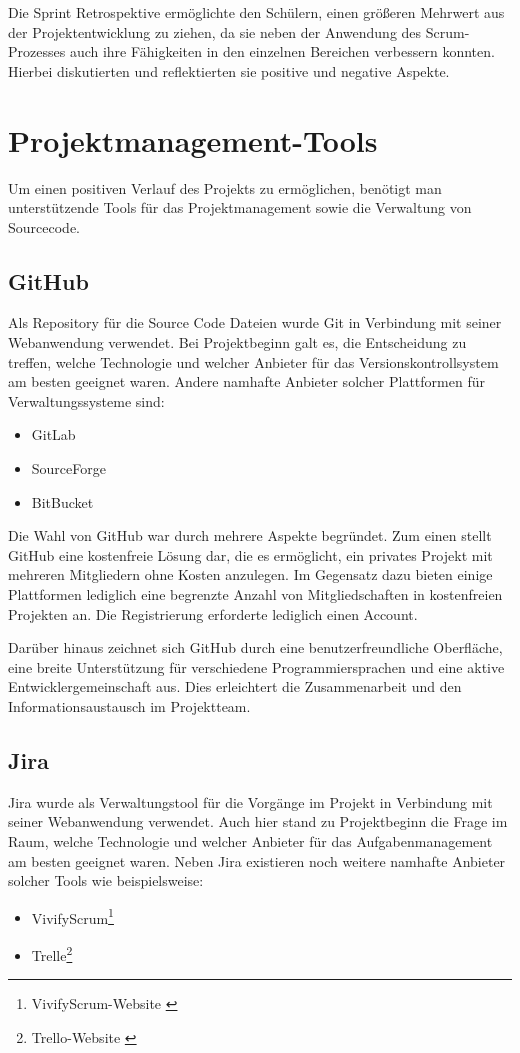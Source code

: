 Die Sprint Retrospektive ermöglichte den Schülern, einen größeren Mehrwert aus der Projektentwicklung zu ziehen, da sie
neben der Anwendung des Scrum-Prozesses auch ihre Fähigkeiten in den einzelnen Bereichen verbessern konnten. Hierbei
diskutierten und reflektierten sie positive und negative Aspekte.

\section{Projektmanagement-Tools}
Um einen positiven Verlauf des Projekts zu ermöglichen, benötigt man unterstützende
Tools für das Projektmanagement sowie die Verwaltung von Sourcecode.

\subsection{GitHub}
Als Repository für die Source Code Dateien wurde Git in Verbindung mit seiner Webanwendung verwendet. Bei Projektbeginn
galt es, die Entscheidung zu treffen, welche Technologie und welcher Anbieter für das Versionskontrollsystem am besten
geeignet waren.
Andere namhafte Anbieter solcher Plattformen für Verwaltungssysteme sind:
\begin{itemize}
    \item GitLab
    \item SourceForge
    \item BitBucket
\end{itemize}

Die Wahl von GitHub war durch mehrere Aspekte begründet. Zum einen stellt GitHub eine kostenfreie Lösung dar, die es
ermöglicht, ein privates Projekt mit mehreren Mitgliedern ohne Kosten anzulegen. Im Gegensatz dazu bieten einige Plattformen
lediglich eine begrenzte Anzahl von Mitgliedschaften in kostenfreien Projekten an. Die Registrierung erforderte lediglich
einen Account.

Darüber hinaus zeichnet sich GitHub durch eine benutzerfreundliche Oberfläche, eine breite Unterstützung für verschiedene
Programmiersprachen und eine aktive Entwicklergemeinschaft aus. Dies erleichtert die Zusammenarbeit und den Informationsaustausch
im Projektteam.

\subsection{Jira}
Jira wurde als Verwaltungstool für die Vorgänge im Projekt in Verbindung mit seiner Webanwendung verwendet. Auch hier
stand zu Projektbeginn die Frage im Raum, welche Technologie und welcher Anbieter für das Aufgabenmanagement am besten
geeignet waren.
Neben Jira existieren noch weitere namhafte Anbieter solcher Tools wie beispielsweise:
\begin{itemize}
    \item VivifyScrum\footnote{VivifyScrum-Website \cite{https://app.vivifyscrum.com}}
    \item Trelle\footnote{Trello-Website \cite{https://Trello.com}}
\end{itemize}

